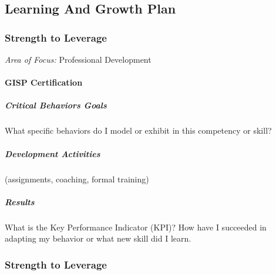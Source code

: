%
%
%
%
% 
\subsection{Learning And Growth Plan}
\subsubsection*{Strength to Leverage}

\textit{Area of Focus:} {\Large Professional Development}

\paragraph{GISP Certification}

\subparagraph{Critical Behaviors Goals}

What specific behaviors do I model or exhibit in this competency or skill?
\vspace{.3in}

\subparagraph{Development Activities}

(assignments, coaching, formal training)
\vspace{.3in}

\subparagraph{Results}

What is the Key Performance Indicator (KPI)? How have I succeeded in adapting my behavior or what new skill did I learn.


\clearpage









\subsubsection*{Strength to Leverage}

